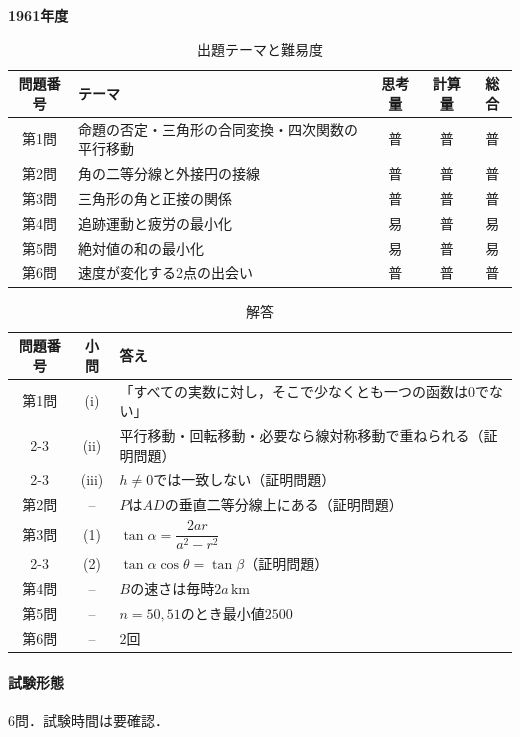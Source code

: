 \documentclass[../../main.tex]{subfiles}
\begin{document}
\begin{center}
  {\fontsize{48pt}{58pt}\selectfont \textbf{1961}\normalsize\textbf{年度}}
\end{center}

\begin{table}[htb]
  \centering
  \caption{出題テーマと難易度}
  \begin{tabular}{|c|p{6.2cm}|c|c|c|}
    \hline
    \textbf{問題番号} & \textbf{テーマ} & \textbf{思考量} & \textbf{計算量} & \textbf{総合} \\
    \hline
    第1問 & 命題の否定・三角形の合同変換・四次関数の平行移動 & 普 & 普 & 普 \\
    \hline
    第2問 & 角の二等分線と外接円の接線 & 普 & 普 & 普 \\
    \hline
    第3問 & 三角形の角と正接の関係 & 普 & 普 & 普 \\
    \hline
    第4問 & 追跡運動と疲労の最小化 & 易 & 普 & 易 \\
    \hline
    第5問 & 絶対値の和の最小化 & 易 & 普 & 易 \\
    \hline
    第6問 & 速度が変化する2点の出会い & 普 & 普 & 普 \\
    \hline
  \end{tabular}
\end{table}

\begin{table}[htb]
  \centering
  \caption{解答}
  \renewcommand{\arraystretch}{1.4}
  \begin{tabular}{|c|c|p{9cm}|}
    \hline
    \textbf{問題番号} & \textbf{小問} & \textbf{答え} \\
    \hline
    第1問 & (i) & 「すべての実数に対し，そこで少なくとも一つの函数は0でない」 \\
    \cline{2-3}
    & (ii) & 平行移動・回転移動・必要なら線対称移動で重ねられる（証明問題） \\
    \cline{2-3}
    & (iii) & $h\ne0$では一致しない（証明問題） \\
    \hline
    第2問 & -- & $P$は$AD$の垂直二等分線上にある（証明問題） \\
    \hline
    第3問 & (1) & $\tan\alpha=\dfrac{2ar}{a^2-r^2}$ \\
    \cline{2-3}
    & (2) & $\tan\alpha\cos\theta=\tan\beta$（証明問題） \\
    \hline
    第4問 & -- & $B$の速さは毎時$2a\,\mathrm{km}$ \\
    \hline
    第5問 & -- & $n=50,51$のとき最小値$2500$ \\
    \hline
    第6問 & -- & $2$回 \\
    \hline
  \end{tabular}
\end{table}

\paragraph{試験形態}
6問．試験時間は要確認．
\end{document}
